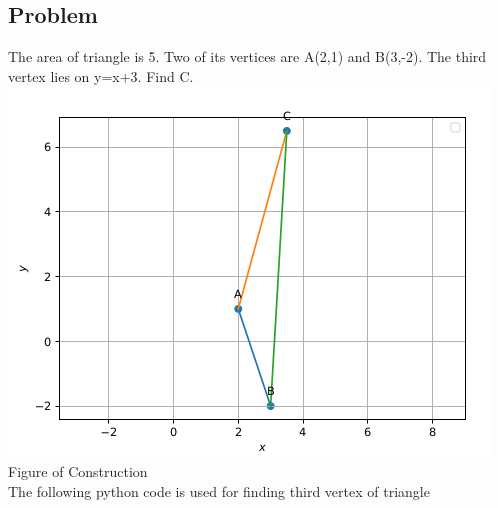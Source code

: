 \documentclass[10pt,a4paper]{report}
\begin{document}
\begin{multicols}{2}
\section*{Problem}
\noindent The area of triangle is 5. Two of its vertices are A(2,1) and B(3,-2). The third vertex lies on y=x+3. Find C.\\
\includegraphics[scale=0.4]{tri.png}\\
Figure of Construction\\
The following python code is used for finding third vertex of triangle
\\

\end{multicols}
\end{document}
